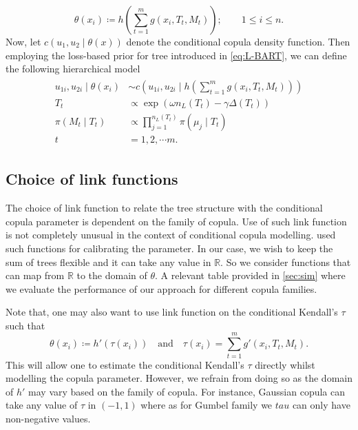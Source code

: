\documentclass{amsart}
\begin{document}
\begin{equation*}
	\theta(x_i) \coloneqq h\left(\sum_{t=1}^m g(x_i, T_t, M_t)\right);\qquad 1\le i\le n.
\end{equation*}
Now, let $c\left(u_1,u_2\mid \theta(x)\right)$ denote the conditional copula density function. Then employing the loss-based prior for tree introduced in \cref{eq:L-BART}, we can define the following hierarchical model 
\begin{align}\label{eq:bayes:hier}
	\begin{split}
		u_{1i},u_{2i} \mid \theta(x_i) & \sim c\left(u_{1i},u_{2i}\mid h\left(\sum_{t=1}^m g(x_i, T_t, M_t)\right)\right)\\
		T_t &\propto \exp\left(\omega n_L(T_t)-\gamma\Delta(T_t)\right)\\
		\pi(M_t\mid T_t) &\propto \prod_{j=1}^{n_L(T_t)}\pi(\mu_j\mid T_t)\\
		t & = 1,2,\cdots m.
	\end{split}
\end{align}

\subsection{Choice of link functions} The choice of link function to relate the tree structure with the conditional copula parameter is dependent on the family of copula. Use of such link function is not completely unusual in the context of conditional copula modelling. \citet{ABEGAZ201243,valle_cond_cop} used such functions for calibrating the parameter. In our case, we wish to keep the sum of trees flexible and it can take any value in $\mathbb{R}$. So we consider functions that can map from $\mathbb{R}$ to the domain of $\theta$. A relevant table provided in \cref{sec:sim} where we evaluate the performance of our approach for different copula families. 

Note that, one may also want to use link function on the conditional Kendall's $\tau$ such that
\begin{equation*}
	\theta(x_i) \coloneqq h'(\tau(x_i))\quad\text{and}\quad \tau(x_i) = \sum_{t=1}^m g'(x_i, T_t, M_t).
\end{equation*}
This will allow one to estimate the conditional Kendall's $\tau$ directly whilst modelling the copula parameter. However, we refrain from doing so as the domain of $h'$ may vary based on the family of copula. For instance, Gaussian copula can take any value of $\tau$ in $(-1,1)$ where as for Gumbel family we $tau$ can only have non-negative values.
\end{document}
